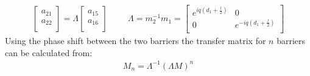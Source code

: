 				\begin{align}
					\left[\begin{array}{cc}
						a_{21}\\
						a_{22}\\
					\end{array}\right]
					=\Lambda
					\left[\begin{array}{cc}
						a_{15}\\
						a_{16}\\
					\end{array}\right]
					\hspace{1cm}	
					\Lambda=m_{2}^{-1}m_{1}=
					\left[\begin{array}{cc}
						e^{iq\left(d_{1}+\frac{l}{2}\right)}&0\\
						0&e^{-iq\left(d_{1}+\frac{l}{2}\right)}\\
					\end{array}\right]
				\end{align}
				Using the phase shift between the two barriers the transfer matrix for $n$ barriers can be calculated from:
				\begin{align}
					M_{n}=\Lambda^{-1}\left(\Lambda M\right)^{n}
					\label{mn}
				\end{align}

